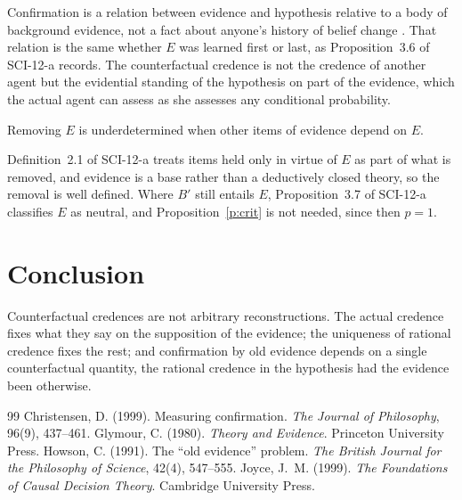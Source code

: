 \documentclass{situationist-preprint}
\begin{document}
\begin{reply}
Confirmation is a relation between evidence and hypothesis relative to a body of background evidence, not a fact about anyone's history of belief change \citep{Christensen1999,Joyce1999}. That relation is the same whether $E$ was learned first or last, as Proposition~3.6 of SCI-12-a records. The counterfactual credence is not the credence of another agent but the evidential standing of the hypothesis on part of the evidence, which the actual agent can assess as she assesses any conditional probability.
\end{reply}

\begin{objection}
Removing $E$ is underdetermined when other items of evidence depend on $E$.
\end{objection}

\begin{reply}
Definition~2.1 of SCI-12-a treats items held only in virtue of $E$ as part of what is removed, and evidence is a base rather than a deductively closed theory, so the removal is well defined. Where $B'$ still entails $E$, Proposition~3.7 of SCI-12-a classifies $E$ as neutral, and Proposition~\ref{p:crit} is not needed, since then $p=1$.
\end{reply}

\section{Conclusion}

Counterfactual credences are not arbitrary reconstructions. The actual credence fixes what they say on the supposition of the evidence; the uniqueness of rational credence fixes the rest; and confirmation by old evidence depends on a single counterfactual quantity, the rational credence in the hypothesis had the evidence been otherwise.

\begin{thebibliography}{99}\small
{} Christensen, D. (1999). Measuring confirmation. \emph{The Journal of Philosophy}, 96(9), 437--461.
 Glymour, C. (1980). \emph{Theory and Evidence}. Princeton University Press.
 Howson, C. (1991). The \enquote{old evidence} problem. \emph{The British Journal for the Philosophy of Science}, 42(4), 547--555.
 Joyce, J.~M. (1999). \emph{The Foundations of Causal Decision Theory}. Cambridge University Press.
\end{thebibliography}
\end{document}
